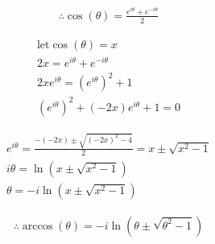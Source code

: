 \documentclass{../../style}
\begin{document}
\eulerformula

\begin{gather*}
	\therefore \cos(\theta) = \frac{e^{i\theta} + e^{-i\theta}}{2}
\end{gather*}

\begin{gather*}
	\text{let} \cos(\theta) = x \\
	2x = e^{i\theta} + e^{-i\theta} \\
	2xe^{i\theta} = (e^{i\theta})^2 + 1 \\ 
	(e^{i\theta})^2 + (-2x)e^{i\theta} + 1 = 0
\end{gather*}

\begin{gather*}
	e^{i\theta} = \frac{-(-2x) \pm \sqrt{(-2x)^2 - 4}}{2} = x \pm \sqrt{x^2 - 1} \\
	i\theta = \ln(x \pm \sqrt{x^2 - 1}) \\
	\theta = -i\ln(x \pm \sqrt{x^2 - 1})
\end{gather*}

\begin{gather*}
	\therefore \arccos(\theta) = -i\ln(\theta \pm \sqrt{\theta^2 - 1})
\end{gather*}
\end{document}
